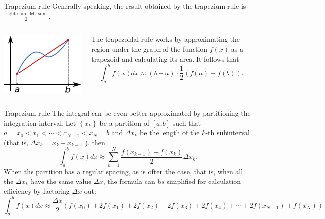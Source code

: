 \documentclass{beamer}
\begin{document}
\begin{frame}{Trapezium rule}
    Generally speaking, the result obtained by the trapezium rule is $\frac{\text{right sum}+\text{left sum}}{2}$.\\
    \begin{columns}
        \begin{column}{0.5\textwidth}
            \includegraphics[width=\textwidth]{Example/assets/5.png}
        \end{column}
        \begin{column}{0.5\textwidth}
            The trapezoidal rule works by approximating the region under the graph of the function $f(x)$ as a trapezoid and calculating its area. It follows that
$$
\int_a^b f(x) d x \approx(b-a) \cdot \frac{1}{2}(f(a)+f(b)) .
$$
        \end{column}
    \end{columns}
\end{frame}

\begin{frame}{Trapezium rule}
The integral can be even better approximated by partitioning the integration interval. Let $\left\{x_k\right\}$ be a partition of $[a, b]$ such that $a=x_0<x_1<\cdots<x_{N-1}<x_N=b$ and $\Delta x_k$ be the length of the $k$-th subinterval (that is, $\Delta x_k=x_k-x_{k-1}$ ), then
$$
\int_a^b f(x) d x \approx \sum_{k=1}^N \frac{f\left(x_{k-1}\right)+f\left(x_k\right)}{2} \Delta x_k .
$$
When the partition has a regular spacing, as is often the case, that is, when all the $\Delta x_k$ have the same value $\Delta x$, the formula can be simplified for calculation efficiency by factoring $\Delta x$ out:
$$
\int_a^b f(x) d x \approx \frac{\Delta x}{2}\left(f\left(x_0\right)+2 f\left(x_1\right)+2 f\left(x_2\right)+2 f\left(x_3\right)+2 f\left(x_4\right)+\cdots+2 f\left(x_{N-1}\right)+f\left(x_N\right)\right)
$$ 
\end{frame}
\end{document}
